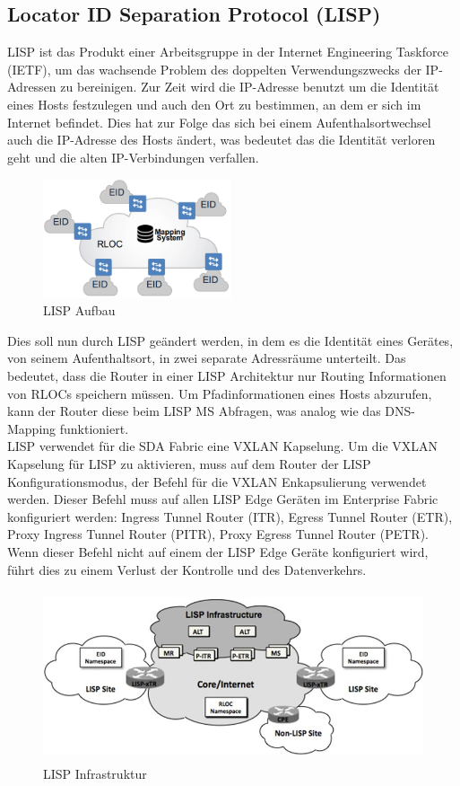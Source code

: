 \subsection{Locator ID Separation Protocol (LISP)} 
LISP ist das Produkt einer Arbeitsgruppe in der Internet Engineering Taskforce (IETF), um das wachsende Problem des doppelten Verwendungszwecks der IP-Adressen zu bereinigen. Zur Zeit wird die IP-Adresse benutzt um die Identität eines Hosts festzulegen und auch den Ort zu bestimmen, an dem er sich im Internet befindet. Dies hat zur Folge das sich bei einem Aufenthalsortwechsel auch die IP-Adresse des Hosts ändert, was bedeutet das die Identität verloren geht und die alten IP-Verbindungen verfallen. \\

\begin{figure}[H]
	\centering
	\includegraphics[height=3.5cm]{img/lisp.png}
	\caption{LISP Aufbau \cite{campusfabric-introduction}}
	\label{fig:LISP Aufbau}
\end{figure}

Dies soll nun durch LISP geändert werden, in dem es die Identität eines Gerätes, von seinem Aufenthaltsort, in zwei separate Adressräume unterteilt. Das bedeutet, dass die Router in einer LISP Architektur nur Routing Informationen von RLOCs speichern müssen. Um Pfadinformationen eines Hosts abzurufen, kann der Router diese beim LISP MS Abfragen, was analog wie das DNS-Mapping funktioniert. \\

LISP verwendet für die SDA Fabric eine VXLAN Kapselung. Um die VXLAN Kapselung für LISP zu aktivieren, muss auf dem Router der LISP Konfigurationsmodus, der Befehl für die VXLAN Enkapsulierung verwendet werden. Dieser Befehl muss auf allen LISP Edge Geräten im Enterprise Fabric konfiguriert werden: Ingress Tunnel Router (ITR), Egress Tunnel Router (ETR), Proxy Ingress Tunnel Router (PITR), Proxy Egress Tunnel Router (PETR). Wenn dieser Befehl nicht auf einem der LISP Edge Geräte konfiguriert wird, führt dies zu einem Verlust der Kontrolle und des Datenverkehrs.  \cite{rfc-6830}

\begin{figure}[H]
	\centering
	\includegraphics[height=5cm]{img/lisp-infrastructure.jpg}
	\caption{LISP Infrastruktur \cite{lisp-overview}}
	\label{fig:LISP Infrastruktur}
\end{figure}

